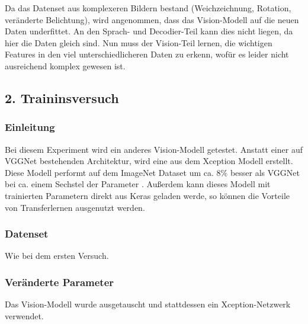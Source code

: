 \documentclass[pdftex,a4paper,halfparskip, article]{scrartcl}
\begin{document}
Da das Datenset aus komplexeren Bildern bestand (Weichzeichnung, Rotation, veränderte Belichtung), wird angenommen, dass das Vision-Modell auf die neuen Daten underfittet. An den Sprach- und Decodier-Teil kann dies nicht liegen, da hier die Daten gleich sind. Nun muss der Vision-Teil lernen, die wichtigen Features in den viel unterschiedlicheren Daten zu erkenn, wofür es leider nicht ausreichend komplex gewesen ist.

\subsection{2. Traininsversuch}

\subsubsection*{Einleitung}

Bei diesem Experiment wird ein anderes Vision-Modell getestet. Anstatt einer auf VGGNet bestehenden Architektur, wird eine aus dem Xception \cite{DBLP:journals/corr/Chollet16a} Modell erstellt. Diese Modell performt auf dem ImageNet Dataset um ca. 8\% besser als VGGNet bei ca. einem Sechstel der Parameter \cite{kerasModels}. Außerdem kann dieses Modell mit trainierten Parametern direkt aus Keras geladen werde, so können die Vorteile von Transferlernen ausgenutzt werden. 

\subsubsection*{Datenset}

Wie bei dem ersten Versuch.

\subsubsection*{Veränderte Parameter}

Das Vision-Modell wurde ausgetauscht und stattdessen ein Xception-Netzwerk verwendet.
\end{document}
